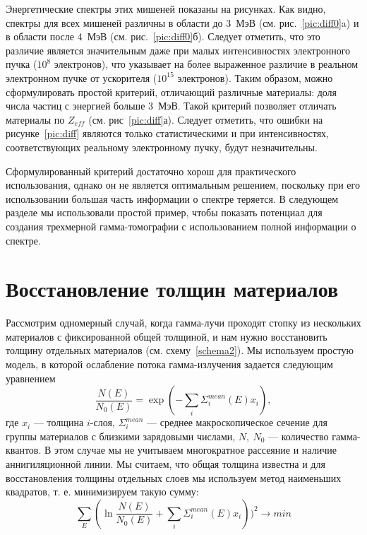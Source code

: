 \documentclass[a4paper]{panl}
\begin{document}
Энергетические спектры этих мишеней показаны на рисунках. Как видно, спектры для всех мишеней различны в области до 3~МэВ (см. рис.~\ref{pic:diff0}a) и в области после 4~МэВ (см. рис.~\ref{pic:diff0}б). Следует отметить, что это различие является значительным даже при малых интенсивностях электронного пучка ($10^8$ электронов), что указывает на более выраженное различие в реальном электронном пучке от ускорителя ($10^{15}$ электронов). Таким образом, можно сформулировать простой критерий, отличающий различные материалы: доля числа частиц с энергией больше 3~МэВ. Такой критерий позволяет отличать материалы по $Z_{eff}$ (см. рис~\ref{pic:diff}а). Следует отметить, что ошибки на рисунке~\ref{pic:diff} являются только статистическими и при интенсивностях, соответствующих реальному электронному пучку, будут незначительны.

Сформулированный критерий достаточно хорош для практического использования, однако он не является оптимальным решением, поскольку при его использовании большая часть информации о спектре теряется. В следующем разделе мы использовали простой пример, чтобы показать потенциал для создания трехмерной гамма-томографии с использованием полной информации о спектре.

\section*{Восстановление толщин материалов}
Рассмотрим одномерный случай, когда гамма-лучи проходят стопку из нескольких материалов с фиксированной общей толщиной, и нам нужно восстановить толщину отдельных материалов (см. схему~\ref{schema2}). Мы используем простую модель, в которой ослабление потока гамма-излучения задается следующим уравнением
\begin{equation}
\label{eq:gamma}
\frac{N(E)}{N_0(E)} = \exp(-\sum_i \Sigma^{mean}_i(E)x_i),
\end{equation}
где $x_i$ --- толщина $i$-слоя, $\Sigma^{mean}_i$ --- среднее макроскопическое сечение для группы материалов с близкими зарядовыми числами, $N,~N_0$ --- количество гамма-квантов. В этом случае мы не учитываем многократное рассеяние и наличие аннигиляционной линии. Мы считаем, что общая толщина известна и для восстановления толщины отдельных слоев мы используем метод наименьших квадратов, т. е. минимизируем такую сумму:
\begin{equation}
\sum_E(\ln \frac{N(E)}{N_0(E)} + \sum_i \Sigma^{mean}_i(E)x_i))^2 \to min
\end{equation}
\end{document}

